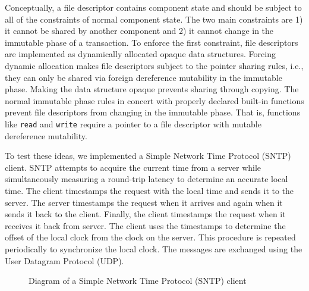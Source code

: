 Conceptually, a file descriptor contains component state and should be subject to all of the constraints of normal component state.
The two main constraints are 1) it cannot be shared by another component and 2) it cannot change in the immutable phase of a transaction.
To enforce the first constraint, file descriptors are implemented as dynamically allocated opaque data structures.
Forcing dynamic allocation makes file descriptors subject to the pointer sharing rules, i.e., they can only be shared via foreign dereference mutability in the immutable phase.
Making the data structure opaque prevents sharing through copying.
The normal immutable phase rules in concert with properly declared built-in functions prevent file descriptors from changing in the immutable phase.
That is, functions like \verb+read+ and \verb+write+ require a pointer to a file descriptor with mutable dereference mutability.

To test these ideas, we implemented a Simple Network Time Protocol (SNTP) client.
SNTP attempts to acquire the current time from a server while simultaneously measuring a round-trip latency to determine an accurate local time.
The client timestamps the request with the local time and sends it to the server.
The server timestamps the request when it arrives and again when it sends it back to the client.
Finally, the client timestamps the request when it receives it back from server.
The client uses the timestamps to determine the offset of the local clock from the clock on the server.
This procedure is repeated periodically to synchronize the local clock.
The messages are exchanged using the User Datagram Protocol (UDP).

\begin{figure}
\centering
{}%
\caption{Diagram of a Simple Network Time Protocol (SNTP) client\label{sntp}}
\end{figure}

